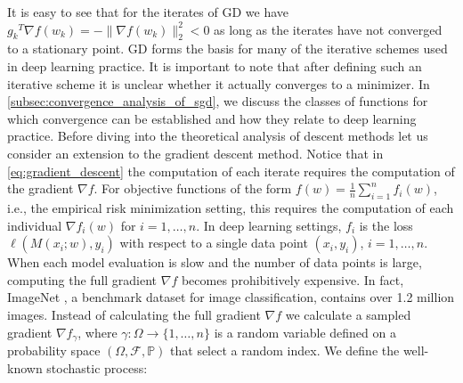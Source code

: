 \documentclass[12pt]{article}
\theoremstyle{definition}
\numberwithin{equation}{section}
\newcommand{\BP}{\mathbb{P}}
\newcommand{\CF}{\mathcal{F}}
\newcommand{\ev}[1]{\mathbb{E}\left[{#1}\right]}
\newcommand{\norm}[1]{\lVert{#1}\rVert_2}
\begin{document}
It is easy to see that for the iterates of GD we have ${g_k}^T \nabla f(w_{k}) = -\norm{ \nabla f(w_{k}) }^2 < 0$ as long as the iterates have not converged to a stationary point. GD forms the basis for many of the iterative schemes used in deep learning practice. It is important to note that after defining such an iterative scheme it is unclear whether it actually converges to a minimizer. In \autoref{subsec:convergence_analysis_of_sgd}, we discuss the classes of functions for which convergence can be established and how they relate to deep learning practice. Before diving into the theoretical analysis of descent methods let us consider an extension to the gradient descent method.
Notice that in \eqref{eq:gradient_descent} the computation of each iterate requires the computation of the gradient $\nabla f$. For objective functions of the form $f(w) = \frac{1}{n} \sum_{i=1}^n f_i(w)$, i.e., the empirical risk minimization setting, this requires the computation of each individual $\nabla f_i(w)$ for $i = 1, \dots, n$. In deep learning settings, $f_i$ is the loss $\ell(M(x_i;w), y_i)$ with respect to a single data point $(x_i, y_i)$, $i=1,\dots,n$. When each model evaluation is slow and the number of data points is large, computing the full gradient $\nabla f$ becomes prohibitively expensive. In fact, ImageNet \cite{dengImageNetLargescaleHierarchical2009}, a benchmark dataset for image classification, contains over 1.2 million images. 
Instead of calculating the full gradient $\nabla f$ we calculate a sampled gradient $\nabla f_{\gamma}$, where $\gamma : \Omega \rightarrow \{1,\dots,n\}$ is a random variable defined on a probability space $(\Omega, \CF, \BP)$ that select a random index. We define the well-known stochastic process:
\end{document}
